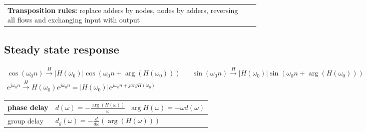 \begin{longtable}{p{}p{}p{}}
	  	   
	  	   \textbf{Transposition rules:} \newline
	  	   replace adders by nodes, \newline
	  	   nodes by adders, \newline
	  	   reversing all flows and \newline
	  	   exchanging input with output
\end{longtable}

\subsection{Steady state response}
\begin{align*}
  \cos(\omega_0 n) \xrightarrow{H} \left|H(\omega_0) \right| \cos(\omega_0 n + \arg(H(\omega_0))) &&
  \sin(\omega_0 n) \xrightarrow{H} \left|H(\omega_0) \right| \sin(\omega_0 n + \arg(H(\omega_0))) \\
  e^{j\omega_0 n} \xrightarrow{H} H(\omega_0)e^{j\omega_0 n} = |H(\omega_0)| e^{j\omega_0 n + j argH(\omega_0)}
\end{align*}


\begin{tabularx}{0.6\textwidth}{|l|X|}
	\hline
	phase delay & $d(\omega) = - \frac{\arg(H(\omega))}{\omega}$\ \qquad $\arg H(\omega) = -\omega d(\omega)$
	\\ \hline 
	group delay & $d_g(\omega) = -\frac{d}{d\omega}(\arg(H(\omega)))$	
	\\ \hline
\end{tabularx}\\ \\

